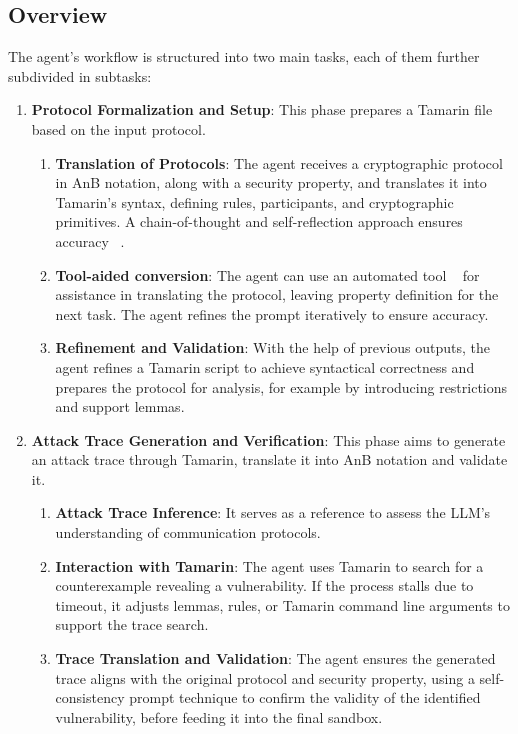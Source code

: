 \subsection{Overview} \label{overview}
The agent's workflow is structured into two main tasks, each of them further subdivided in subtasks:
\begin{enumerate}[label=\arabic*.]
    \item \textbf{Protocol Formalization and Setup}: This phase prepares a Tamarin file based on the input protocol.
    \begin{enumerate}[label=1.\arabic*]
        \item \textbf{Translation of Protocols}: The agent receives a cryptographic protocol in AnB notation, along with a security property, and translates it into Tamarin’s syntax, defining rules, participants, and cryptographic primitives. A chain-of-thought and self-reflection approach ensures accuracy ~\cite{renze2024self}.
        \item \textbf{Tool-aided conversion}: The agent can use an automated tool ~\cite{Basin2015} for assistance in translating the protocol, leaving property definition for the next task. The agent refines the prompt iteratively to ensure accuracy.
        \item \textbf{Refinement and Validation}: With the help of previous outputs, the agent refines a Tamarin script to achieve syntactical correctness and prepares the protocol for analysis, for example by introducing restrictions and support lemmas.
    \end{enumerate}
    \item \textbf{Attack Trace Generation and Verification}: This phase aims to generate an attack trace through Tamarin, translate it into AnB notation and validate it.
    \begin{enumerate}[label=2.\arabic*]
        \item \textbf{Attack Trace Inference}: It serves as a reference to assess the LLM's understanding of communication protocols.
        \item \textbf{Interaction with Tamarin}: The agent uses Tamarin to search for a counterexample revealing a vulnerability. If the process stalls due to timeout, it adjusts lemmas, rules, or Tamarin command line arguments to support the trace search.
        \item \textbf{Trace Translation and Validation}: The agent ensures the generated trace aligns with the original protocol and security property, using a self-consistency prompt technique to confirm the validity of the identified vulnerability, before feeding it into the final sandbox.
    \end{enumerate}
\end{enumerate}

